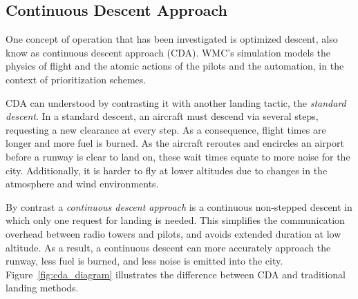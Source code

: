 \documentclass[journal]{IEEEtran}
\newcommand{\fig}[1]{Figure~\ref{fig:#1}}
\begin{document}
\subsection{Continuous Descent Approach}

One concept of operation that has been investigated is optimized descent, also know as continuous descent approach (CDA).
WMC's  simulation models the physics of flight and the atomic actions of the pilots and the automation, in the context of prioritization schemes.


CDA can understood by contrasting it with another landing tactic, the {\em standard descent}.  
In a standard descent, an aircraft must descend via several steps, requesting a new clearance at every step.  
As a consequence, flight times are longer and more fuel is burned.  
As the aircraft reroutes and encircles an airport before a runway is clear to land on, these wait times equate to more noise for the city.
Additionally, it is harder to fly at lower altitudes due to changes in the atmosphere and wind environments.

By contrast a {\em continuous descent approach} is a continuous non-stepped descent in which only one request for landing is needed.  
This simplifies the communication overhead between radio towers and pilots, and avoids extended duration at low altitude.  
As a result, a continuous descent can more accurately approach the runway, less fuel is burned, and less noise is emitted into the city.  
\fig{cda_diagram} illustrates the difference between CDA and traditional landing methods.

 



 
\end{document}
